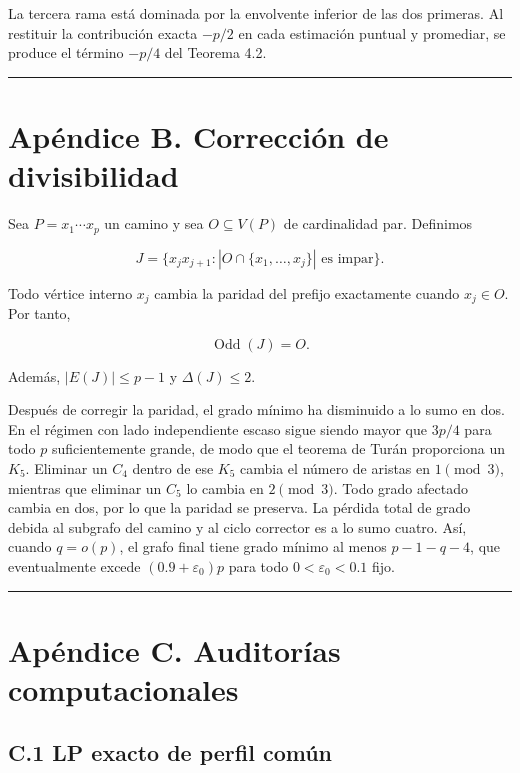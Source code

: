 \documentclass[
  11pt,
]{article}
\begin{document}
La tercera rama está dominada por la envolvente inferior de las dos
primeras. Al restituir la contribución exacta \(-p/2\) en cada
estimación puntual y promediar, se produce el término \(-p/4\) del
Teorema 4.2.

\begin{center}\rule{0.5\linewidth}{0.5pt}\end{center}

\section{Apéndice B. Corrección de
divisibilidad}\label{apuxe9ndice-b.-correcciuxf3n-de-divisibilidad}

Sea \(P=x_1\cdots x_p\) un camino y sea \(O\subseteq V(P)\) de
cardinalidad par. Definimos

\[
J=\{x_jx_{j+1}:|O\cap\{x_1,\ldots,x_j\}|\text{ es impar}\}.
\]

Todo vértice interno \(x_j\) cambia la paridad del prefijo exactamente
cuando \(x_j\in O\). Por tanto,

\[
\operatorname{Odd}(J)=O.
\]

Además, \(|E(J)|\le p-1\) y \(\Delta(J)\le2\).

Después de corregir la paridad, el grado mínimo ha disminuido a lo sumo
en dos. En el régimen con lado independiente escaso sigue siendo mayor
que \(3p/4\) para todo \(p\) suficientemente grande, de modo que el
teorema de Turán proporciona un \(K_5\). Eliminar un \(C_4\) dentro de
ese \(K_5\) cambia el número de aristas en \(1\pmod3\), mientras que
eliminar un \(C_5\) lo cambia en \(2\pmod3\). Todo grado afectado cambia
en dos, por lo que la paridad se preserva. La pérdida total de grado
debida al subgrafo del camino y al ciclo corrector es a lo sumo cuatro.
Así, cuando \(q=o(p)\), el grafo final tiene grado mínimo al menos
\(p-1-q-4\), que eventualmente excede \((0.9+\varepsilon_0)p\) para todo
\(0<\varepsilon_0<0.1\) fijo.

\begin{center}\rule{0.5\linewidth}{0.5pt}\end{center}

\section{Apéndice C. Auditorías
computacionales}\label{apuxe9ndice-c.-auditoruxedas-computacionales}

\subsection{C.1 LP exacto de perfil
común}\label{c.1-lp-exacto-de-perfil-comuxfan}
\end{document}
